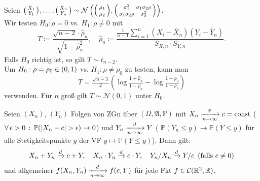 \documentclass{cheat-sheet}
\newcommand{\Alg}{\mathfrak{A}} %
\renewcommand{\P}{\mathbb{P}} %
\newcommand{\Cont}{\mathcal{C}} %
\newcommand{\Normal}{\mathcal{N}} %
\begin{document}
\begin{bsp}
  Seien $\begin{psmallmatrix} X_1 \\ Y_1 \end{psmallmatrix}, \ldots, \begin{psmallmatrix} X_n \\ Y_n \end{psmallmatrix} \sim \Normal\left(
    \begin{psmallmatrix}
      \mu_1\vphantom{\sigma_1^2} \\
      \mu_2\vphantom{\sigma_2^2}
    \end{psmallmatrix},
    \begin{psmallmatrix}
      \sigma_1^2 & \sigma_1 \sigma_2 \rho \\
      \sigma_1 \sigma_2 \rho & \sigma_2^2
    \end{psmallmatrix} \right)$. \\[2pt]
  Wir testen $H_0 : \rho = 0$ vs. $H_1 : \rho \neq 0$ mit
  \[
    T \coloneqq \frac{\sqrt{n-2} \cdot \hat{\rho}_n}{\sqrt{1 - \hat{\rho}_n^2}}, \quad
    \hat{\rho}_n \coloneqq \frac{\tfrac{1}{n-1} \sum_{i=1}^n (X_i - \overline{X}_n) (Y_i - \overline{Y}_n)}{S_{X,n} \cdot S_{Y,n}}.
  \]
  Falls $H_0$ richtig ist, so gilt $T \sim t_{n-2}$. \\[2pt]
  Um $H_0 : \rho = \rho_0 \in \left( 0, 1 \right)$ vs. $H_1 : \rho \neq \rho_0$ zu testen, kann man
  \[ T = \tfrac{\sqrt{n-3}}{2} \left( \log \tfrac{1 + \hat{\rho}_n}{1 - \hat{\rho}_n} - \log \tfrac{1+\rho_0}{1-\rho_0} \right) \]
  verwenden. Für $n$ groß gilt $T \sim \Normal(0, 1)$ unter $H_0$.
\end{bsp}


\begin{lem}
  Seien $(X_n)$, $(Y_n)$ Folgen von ZGn über $(\Omega, \Alg, \P)$ mit $X_n \xra[n \to \infty]{\P} c = \text{const}$ (\dh{} $\fa{\epsilon > 0} \P(\abs{X_n - c} > \epsilon) \to 0$) und $Y_n \xrightarrow[n \to \infty]{d} Y$ (\dh{} $\P(Y_n \leq y) \to \P(Y \leq y)$ für alle Stetigkeitspunkte $y$ der VF $y \mapsto \P(Y \leq y)$). Dann gilt:
  \[
    X_n + Y_n \xrightarrow{d} c + Y, \quad
    X_n \cdot Y_n \xrightarrow{d} c \cdot Y, \quad
    Y_n / X_n \xrightarrow{d} Y / c \enspace \text{(falls $c \neq 0$)}
  \]
  und allgemeiner $f(X_n, Y_n) \xrightarrow[n \to \infty]{d} f(c, Y)$ für jede Fkt $f \in \Cont(\R^2, \R)$.
\end{lem}
\end{document}
